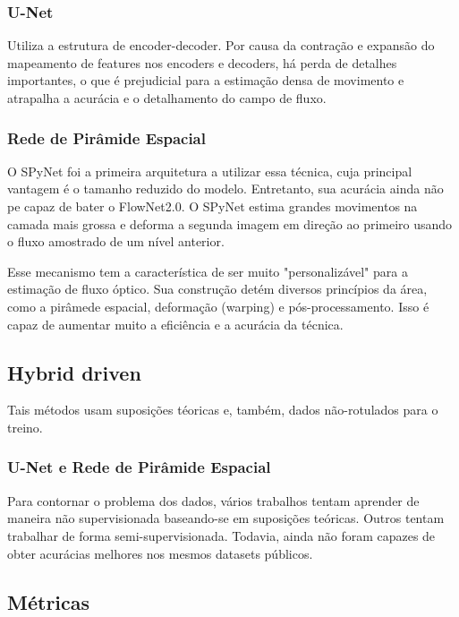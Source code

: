 \documentclass[12pt, a4paper]{article}
\begin{document}
\subsubsection{U-Net}

Utiliza a estrutura de encoder-decoder. Por causa da contração e expansão do mapeamento de features nos encoders e decoders, há perda de detalhes importantes, o que é prejudicial para a estimação densa de movimento e atrapalha a acurácia e o detalhamento do campo de fluxo.

\subsubsection{Rede de Pirâmide Espacial}

O SPyNet foi a primeira arquitetura a utilizar essa técnica, cuja principal vantagem é o tamanho reduzido do modelo. Entretanto, sua acurácia ainda não pe capaz de bater o FlowNet2.0. O SPyNet estima grandes movimentos na camada mais grossa e deforma a segunda imagem em direção ao primeiro usando o fluxo amostrado de um nível anterior.

Esse mecanismo tem a característica de ser muito "personalizável" para a estimação de fluxo óptico. Sua construção detém diversos princípios da área, como a pirâmede espacial, deformação (warping) e pós-processamento. Isso é capaz de aumentar muito a eficiência e a acurácia da técnica.

\subsection{Hybrid driven}

Tais métodos usam suposições téoricas e, também, dados não-rotulados para o treino.

\subsubsection{U-Net e Rede de Pirâmide Espacial}

Para contornar o problema dos dados, vários trabalhos tentam aprender de maneira não supervisionada baseando-se em suposições teóricas. Outros tentam trabalhar de forma semi-supervisionada. Todavia, ainda não foram capazes de obter acurácias melhores nos mesmos datasets públicos.

\subsection{Métricas}
\end{document}
